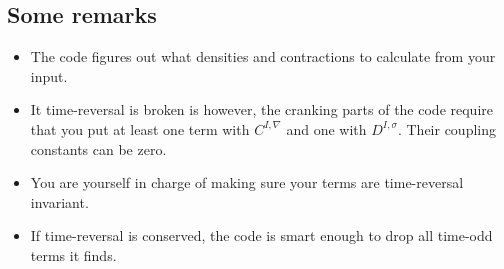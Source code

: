 \documentclass[print,amsmath,amssymb,aps,prc,nofootinbib,notitlepage]{revtex4-1}
\begin{document}
\subsection{Some remarks}

\begin{itemize}
\item The code figures out what densities and contractions to calculate from your input.
\item It time-reversal is broken is however, the cranking parts of the code require that you put at least one term with $C^{I, \nabla}$ and one with $D^{I, \sigma}$. Their coupling constants can be zero.
\item You are yourself in charge of making sure your terms are time-reversal invariant.
\item If time-reversal is conserved, the code is smart enough to drop all time-odd terms it finds.
\end{itemize}
\end{document}
